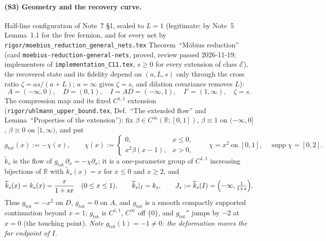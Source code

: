 \documentclass[11pt]{article}
\newcommand{\kt}{\widetilde k}
\newcommand{\gtot}{g_{\mathrm{tot}}}
\newcommand{\supp}{\operatorname{supp}}
\begin{document}
\paragraph{(S3) Geometry and the recovery curve.}
Half-line configuration of Note~7 \S1, scaled to $L=1$ (legitimate: by Note~5 Lemma~1.1 for the free fermion, and for every net by \texttt{rigor/moebius\_reduction\_general\_nets.tex} Theorem~``M\"obius reduction'' (card \texttt{moebius-reduction-general-nets}, proved, review passed 2026-11-19; implementers of \texttt{implementation\_C11.tex}, $s\ge0$ for every extension of class $\mathcal E$), the recovered state and its fidelity
depend on $(a,L,s)$ only through the cross ratio $\zeta=as/(a+L)$; $a=\infty$ gives $\zeta=s$, and
dilation covariance removes $L$):
\begin{equation}\label{eq:geom}
 A=(-\infty,0),\quad D=(0,1),\quad I=AD=(-\infty,1),\quad I'=(1,\infty),\quad \zeta=s .
\end{equation}
The compression map and its fixed $C^{1,1}$ extension
(\texttt{rigor/uhlmann\_upper\_bound.tex}, Def.~``The extended flow'' and Lemma~``Properties of the
extension''): fix $\beta\in C^\infty(\mathbb R;[0,1])$, $\beta\equiv1$ on $(-\infty,0]$, $\beta\equiv0$ on
$[1,\infty)$, and put
\begin{equation}\label{eq:chi}
 \gtot(x):=-\chi(x),\qquad \chi(x):=\begin{cases}0,&x\le0,\\ x^2\beta(x-1),&x>0,\end{cases}
 \qquad \chi=x^2\ \text{on }[0,1],\quad\supp\chi=[0,2].
\end{equation}
$\kt_s$ is the flow of $\gtot\,\partial_x=-\chi\partial_x$; it is a one-parameter group of $C^{1,1}$
increasing bijections of $\mathbb R$ with $\kt_s(x)=x$ for $x\le0$ and $x\ge2$, and
\begin{equation}\label{eq:ks}
 \kt_s(x)=k_s(x)=\frac{x}{1+sx}\quad (0\le x\le1),\qquad \kt_s|_I=k_s,\qquad
 J_s:=\kt_s(I)=\Bigl(-\infty,\tfrac1{1+s}\Bigr).
\end{equation}
Thus $\gtot=-x^2$ on $D$, $\gtot=0$ on $A$, and $\gtot$ is a smooth compactly supported continuation beyond
$x=1$; $\gtot$ is $C^{1,1}$, $C^\infty$ off $\{0\}$, and $\gtot''$ jumps by $-2$ at $x=0$ (the touching point).
\emph{Note $\gtot(1)=-1\ne0$: the deformation moves the far endpoint of $I$.}
\end{document}
